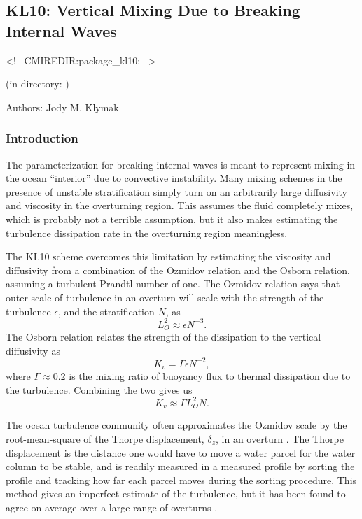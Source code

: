 \subsection{KL10: Vertical Mixing Due to Breaking Internal Waves}
\label{sec:pkg:kl10}
\begin{rawhtml}
<!-- CMIREDIR:package_kl10: -->
\end{rawhtml}
\begin{center}
(in directory: )
\end{center}

Authors: Jody M. Klymak

\subsubsection{Introduction
\label{sec:pkg:kl10:intro}}

The \citet[][KL10]{klymaklegg10} parameterization for breaking internal waves is meant to represent mixing in the ocean ``interior'' due to convective instability.   Many mixing schemes in the presence of unstable stratification simply turn on an arbitrarily large diffusivity and viscosity in the overturning region.  This assumes the fluid completely mixes, which is probably not a terrible assumption, but it also makes estimating the turbulence dissipation rate in the overturning region meaningless.

The KL10 scheme overcomes this limitation by estimating the viscosity and diffusivity from a combination of the Ozmidov relation and the Osborn relation, assuming a turbulent Prandtl number of one.  The Ozmidov relation says that outer scale of turbulence in an overturn will scale with the strength of the turbulence $\epsilon$, and the stratification $N$, as
\begin{equation}
\label{eq:pkg:kl10:Lo}
  L_O^2 \approx \epsilon N^{-3}.
\end{equation}
The Osborn relation relates the strength of the dissipation to the vertical diffusivity as
\begin{equation}
  K_{v}=\Gamma \epsilon N^{-2},
\end{equation}
where $\Gamma\approx 0.2$ is the mixing ratio of buoyancy flux to thermal dissipation due to the turbulence.  Combining the two  gives us
\begin{equation}
  K_{v} \approx \Gamma L_O^2 N.
\end{equation}

The ocean turbulence community often approximates the Ozmidov scale by the root-mean-square of the Thorpe displacement, $\delta_z$, in an overturn \citep{thorpe77}.
The Thorpe displacement is the distance one would have to move a water parcel for the water column to be stable, and is readily measured in a measured profile by sorting the profile and tracking how far each parcel moves during the sorting procedure.
This method gives an imperfect estimate of the turbulence, but it has been found to agree on average over a large range of overturns \citep{wesson94,seimgregg94,moum96}.

